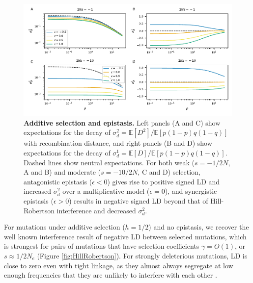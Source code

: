 \documentclass[]{article}
\newcommand{\E}{\mathbb{E}}
\begin{document}
\begin{figure}[tb!]
    \internallinenumbers
    \centering
    \includegraphics{../figures/epistasis_prediction}
    \caption{
        \textbf{Additive selection and epistasis.}
        Left panels (A and C) show expectations for the decay of
        \(\sigma_d^2 = \E[D^2] / \E[p(1-p)q(1-q)]\) with recombination
        distance, and right panels (B and D) show expectations for the
        decay of \(\sigma_d^1 = \E[D] / \E[p(1-p)q(1-q)]\). Dashed lines
        show neutral expectations.
        For both weak (\(s=-1/2N\), A and B) and moderate
        (\(s=-10/2N\), C and D) selection,
        antagonistic epistasis (\(\epsilon < 0\))
        gives rise to positive signed LD and increased $\sigma_d^2$ over
        a multiplicative model (\(\epsilon = 0\)),
        and synergistic epistasis (\(\epsilon > 0\)) results in negative signed
        LD beyond that of Hill-Robertson interference and decreased \(\sigma_d^2\).
    }
    \label{fig:epistasis}
\end{figure}

For mutations under additive selection (\(h=1/2\)) and no epistasis, we
recover the well known \citet{Hill1966-gv} interference result of negative LD
between selected mutations, which is strongest for pairs of mutations that have
selection coefficients \(\gamma = O(1)\), or \(s \approx 1/2N_e\) (Figure
\ref{fig:HillRobertson}).
For strongly deleterious mutations, LD is close to zero even
with tight linkage, as they almost always segregate at low enough frequencies
that they are unlikely to interfere with each other \citep{McVean2000-ox}.
\end{document}
